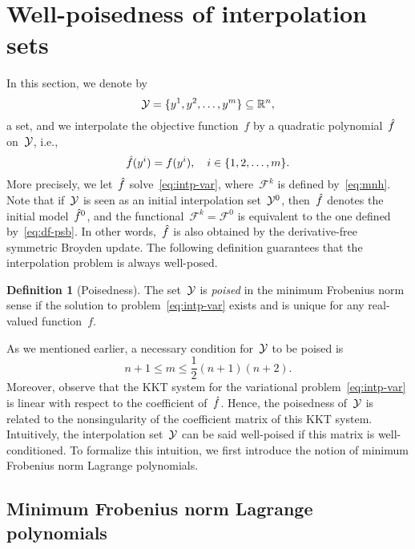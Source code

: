 \documentclass[draft]{article}
\numberwithin{equation}{section}
\theoremstyle{definition}
\newtheorem{definition}{Definition}[section]
\theoremstyle{plain}
\newcommand{\obj}{f}
\newcommand{\objm}[1][]{\hat{\obj}\ifblank{#1}{}{^{#1}}}
\newcommand{\R}{\mathbb{R}}
\newcommand{\set}[2][]{#1\{#2#1\}}
\newcommand{\xpt}[1][]{\mathcal{Y}\ifblank{#1}{}{^{#1}}}
\begin{document}
\section{Well-poisedness of interpolation sets}
\label{sec:well-poisedness}

In this section, we denote by
\begin{equation*}
    \xpt = \set{y^1, y^2, \dots, y^m} \subseteq \R^n,
\end{equation*}
a set, and we interpolate the objective function~$\obj$ by a quadratic polynomial~$\objm$ on~$\xpt$, i.e.,
\begin{equation}
    \label{eq:intp-cond-gen}
    \objm(y^i) = \obj(y^i), \quad i \in \set{1, 2, \dots, m}.
\end{equation}
More precisely, we let~$\objm$ solve~\eqref{eq:intp-var}, where~$\mathcal{F}^k$ is defined by~\eqref{eq:mnh}.
Note that if~$\xpt$ is seen as an initial interpolation set~$\xpt[0]$, then~$\objm$ denotes the initial model~$\objm[0]$, and the functional~$\mathcal{F}^k = \mathcal{F}^0$ is equivalent to the one defined by~\eqref{eq:df-psb}.
In other words,~$\objm$ is also obtained by the derivative-free symmetric Broyden update.
The following definition guarantees that the interpolation problem is always well-posed.

\begin{definition}[Poisedness]
    The set~$\xpt$ is \emph{poised} in the minimum Frobenius norm sense if the solution to problem~\eqref{eq:intp-var} exists and is unique for any real-valued function~$\obj$.
\end{definition}

As we mentioned earlier, a necessary condition for~$\xpt$ to be poised is
\begin{equation*}
    n + 1 \le m \le \frac{1}{2} (n + 1) (n + 2).
\end{equation*}
Moreover, observe that the KKT system for the variational problem~\eqref{eq:intp-var} is linear with respect to the coefficient of~$\objm$.
Hence, the poisedness of~$\xpt$ is related to the nonsingularity of the coefficient matrix of this KKT system.
Intuitively, the interpolation set~$\xpt$ can be said well-poised if this matrix is well-conditioned.
To formalize this intuition, we first introduce the notion of minimum Frobenius norm Lagrange polynomials.

\subsection{Minimum Frobenius norm Lagrange polynomials}
\end{document}
